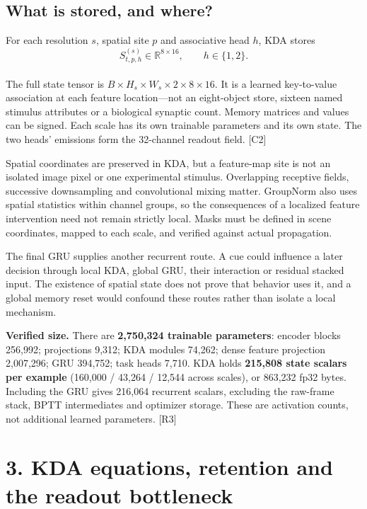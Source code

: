 \documentclass[
  10pt,
]{article}
\begin{document}
\subsection{What is stored, and where?}\label{what-is-stored-and-where}

For each resolution \(s\), spatial site \(p\) and associative head
\(h\), KDA stores\\
\[
S_{t,p,h}^{(s)}\in\mathbb{R}^{8\times16},\qquad h\in\{1,2\}.
\]\\
The full state tensor is
\(B\times H_s\times W_s\times2\times8\times16\). It is a learned
key-to-value association at each feature location---not an eight-object
store, sixteen named stimulus attributes or a biological synaptic count.
Memory matrices and values can be signed. Each scale has its own
trainable parameters and its own state. The two heads' emissions form
the 32-channel readout field. {[}C2{]}

Spatial coordinates are preserved in KDA, but a feature-map site is not
an isolated image pixel or one experimental stimulus. Overlapping
receptive fields, successive downsampling and convolutional mixing
matter. GroupNorm also uses spatial statistics within channel groups, so
the consequences of a localized feature intervention need not remain
strictly local. Masks must be defined in scene coordinates, mapped to
each scale, and verified against actual propagation.

The final GRU supplies another recurrent route. A cue could influence a
later decision through local KDA, global GRU, their interaction or
residual stacked input. The existence of spatial state does not prove
that behavior uses it, and a global memory reset would confound these
routes rather than isolate a local mechanism.

\textbf{Verified size.} There are \textbf{2,750,324 trainable
parameters}: encoder blocks 256,992; projections 9,312; KDA modules
74,262; dense feature projection 2,007,296; GRU 394,752; task heads
7,710. KDA holds \textbf{215,808 state scalars per example} (160,000 /
43,264 / 12,544 across scales), or 863,232 fp32 bytes. Including the GRU
gives 216,064 recurrent scalars, excluding the raw-frame stack, BPTT
intermediates and optimizer storage. These are activation counts, not
additional learned parameters. {[}R3{]}

\newpage

\section{3. KDA equations, retention and the readout
bottleneck}\label{kda-equations-retention-and-the-readout-bottleneck}
\end{document}

